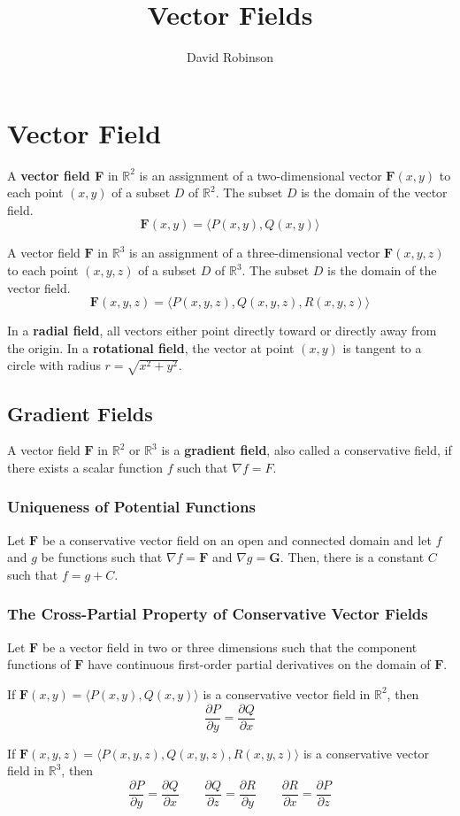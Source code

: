 \documentclass{article}
\title{Vector Fields}
\author{David Robinson}
\date{}
\begin{document}
\maketitle

\section*{Vector Field}

A \textbf{vector field F} in $\mathbb{R}^2$ is an assignment of a two-dimensional vector $\mathbf{F}(x,y)$ to each point $(x,y)$ of a subset $D$ of $\mathbb{R}^2$. The subset $D$ is the domain of the vector field.
\[\mathbf{F}(x,y)=\langle P(x,y), Q(x,y)\rangle\]

A vector field $\mathbf{F}$ in $\mathbb{R}^3$ is an assignment of a three-dimensional vector $\mathbf{F}(x,y,z)$ to each point $(x,y,z)$ of a subset $D$ of $\mathbb{R}^3$. The subset $D$ is the domain of the vector field.
\[\mathbf{F}(x,y,z)=\langle P(x,y,z), Q(x,y,z), R(x,y,z)\rangle\]

In a \textbf{radial field}, all vectors either point directly toward or directly away from the origin. In a \textbf{rotational field}, the vector at point $(x,y)$ is tangent to a circle with radius $r=\sqrt{x^2+y^2}$.

\subsection*{Gradient Fields}
A vector field $\mathbf{F}$ in $\mathbb{R}^2$ or $\mathbb{R}^3$ is a \textbf{gradient field}, also called a conservative field, if there exists a scalar function $f$ such that $\nabla f = F$.

\subsubsection*{Uniqueness of Potential Functions}
Let $\mathbf{F}$ be a conservative vector field on an open and connected domain and let $f$ and $g$ be functions such that $\nabla f=\mathbf{F}$ and $\nabla g=\mathbf{G}$. Then, there is a constant $C$ such that $f=g+C$.

\subsubsection*{The Cross-Partial Property of Conservative Vector Fields}
Let $\mathbf{F}$ be a vector field in two or three dimensions such that the component functions of $\mathbf{F}$ have continuous first-order partial derivatives on the domain of $\mathbf{F}$.
\vspace{1em}

If $\mathbf{F}(x,y)=\langle P(x,y),Q(x,y)\rangle$ is a conservative vector field in $\mathbb{R}^2$, then
\[\frac{\partial P}{\partial y}=\frac{\partial Q}{\partial x}\]

If $\mathbf{F}(x,y,z)=\langle P(x,y,z),Q(x,y,z),R(x,y,z)\rangle$ is a conservative vector field in $\mathbb{R}^3$, then
\[\frac{\partial P}{\partial y}=\frac{\partial Q}{\partial x}\quad\quad\frac{\partial Q}{\partial z}=\frac{\partial R}{\partial y}\quad\quad\frac{\partial R}{\partial x}=\frac{\partial P}{\partial z}\]
\end{document}
